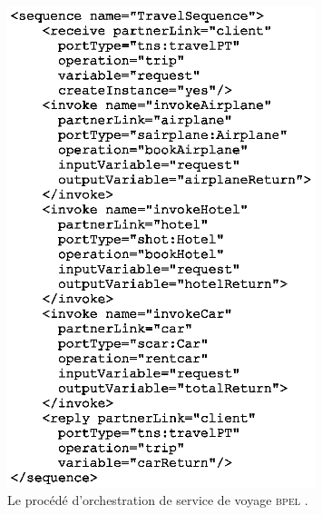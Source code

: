 \begin{figure}[h]
    \centering
    \includegraphics[width=0.8\textwidth]{figs/bpel_travel_example_document.eps}
    \caption{Le procédé d'orchestration de service de voyage
      \textsc{bpel} \cite{claro2006web}.}
    \label{fig:bpel_travel_example_document}
\end{figure}
